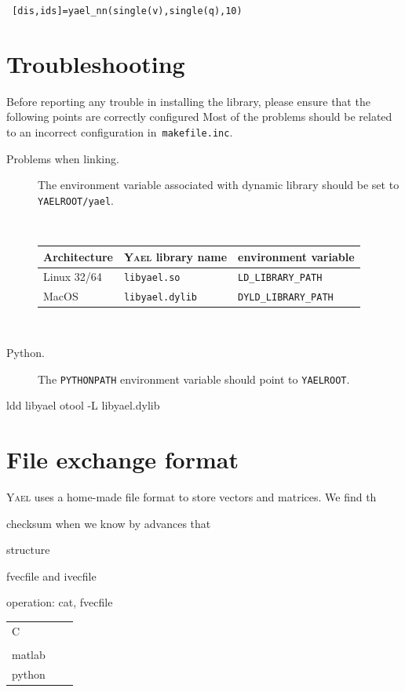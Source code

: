 \documentclass[a4paper,11pt,notitlepage,final,twoside]{report}
\newcommand{\yael}{\textsc{Yael}\xspace}
\newcommand{\yroot}{\texttt{YAELROOT}\xspace}
\newcommand{\tc}[1]{\texttt{#1}}
\newcommand{\code}[1]{\smallskip 

\texttt{#1} 
 \medskip

}
\begin{document}
\code{
[dis,ids]=yael\_nn(single(v),single(q),10)
}

\chapter{Troubleshooting}

Before reporting any trouble in installing the library, please
ensure that the following points are correctly configured 
Most of the problems should be related to an incorrect configuration 
in~\tc{makefile.inc}. 


\begin{description}
\item [Problems when linking.] The environment variable associated with dynamic library should be set to \tc{\yroot/yael}. 

{~ \hfill 
\begin{tabular}{|lll|}
\hline
Architecture & \yael library name  &  environment variable  \\
\hline
Linux 32/64  & \tc{libyael.so}  & \tc{LD\_LIBRARY\_PATH} \\
MacOS       & \tc{libyael.dylib} & \tc{DYLD\_LIBRARY\_PATH} \\
\hline
\end{tabular} \hfill ~}

\item [Python.] The \tc{PYTHONPATH} environment variable should 
point to \tc{YAELROOT}. 

\end{description}

ldd libyael 
otool -L libyael.dylib


\appendix                     %

\chapter{File exchange format}               %

\yael uses a home-made file format to store vectors and matrices. 
We find th

checksum when we know by advances that 

structure 

fvecfile and ivecfile


operation: cat, fvecfile

\begin{tabular}{lll}
C         & & \\
          & & \\
matlab    & & \\
python    & & \\
\end{tabular}


\end{document}

